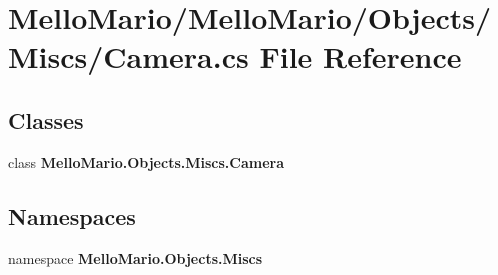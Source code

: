 \section{Mello\+Mario/\+Mello\+Mario/\+Objects/\+Miscs/\+Camera.cs File Reference}
\label{Camera_8cs}
\subsection*{Classes}
\begin{DoxyCompactItemize}
\item 
class \textbf{ Mello\+Mario.\+Objects.\+Miscs.\+Camera}
\end{DoxyCompactItemize}
\subsection*{Namespaces}
\begin{DoxyCompactItemize}
\item 
namespace \textbf{ Mello\+Mario.\+Objects.\+Miscs}
\end{DoxyCompactItemize}
